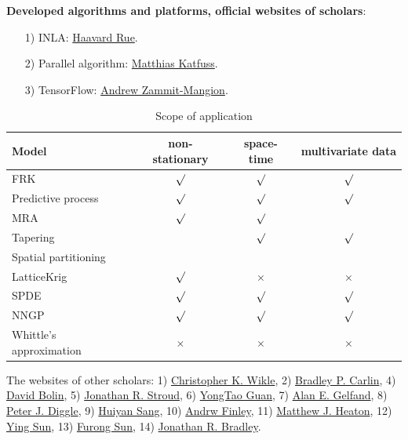 \documentclass[
12pt, %
a4paper, %
oneside, %
headinclude,footinclude, %
BCOR5mm, %
]{scrartcl}
\begin{document}
\textbf{Developed algorithms and platforms, official websites of scholars}:
\begin{itemize}
  \item [1)] INLA: \href{https://cemse.kaust.edu.sa/bayescomp}{Haavard Rue}.
  \item [2)] Parallel algorithm: \href{https://sites.google.com/view/katzfuss/}{Matthias Katfuss}.
  \item [3)] TensorFlow: \href{https://niasra.uow.edu.au/cei/people/UOW202823.html}{Andrew Zammit-Mangion}.
\end{itemize}
\begin{table}[H]
	\caption{Scope of application}
\begin{tabular}{|l|c|c|c|}
\hline
{\bf Model} & {\bf non-stationary} & {\bf space-time} & {\bf multivariate data} \\
\hline
       FRK &  $\surd$    &   $\surd$         &     $\surd$       \\
\hline
Predictive process &   $\surd$     &    $\surd$   &  $\surd$          \\
\hline
       MRA &  $\surd$     &    $\surd$    &            \\
\hline
  Tapering &      &    $\surd$   &    $\surd$    \\
\hline
Spatial partitioning &            &            &            \\
\hline
LatticeKrig &   $\surd$     &   $\times$    &   $\times$    \\
\hline
      SPDE &   $\surd$    &    $\surd$   &    $\surd$  \\
\hline
      NNGP &   $\surd$    &    $\surd$    &   $\surd$         \\
\hline
Whittle’s approximation &   $\times$      &   $\times$    &    $\times$   \\
\hline
\end{tabular}
  \label{table:Scope}
\end{table}

The websites of other scholars: 1) \href{https://www.stat.missouri.edu/people/wikle}{Christopher K. Wikle}, 2)
\href{https://www.counterpointstat.com/bradleycarlin.html}{Bradley P. Carlin}, 4)
\href{https://cemse.kaust.edu.sa/stochproc}{David Bolin}, 5)
\href{https://gufaculty360.georgetown.edu/s/contact/00336000014SrlEAAS/jonathan-stroud}{Jonathan R. Stroud}, 6)
\href{https://www.bus.miami.edu/thought-leadership/faculty/management-science/guan.html}{YongTao Guan}, 7)
\href{http://www2.stat.duke.edu/~alan/}{Alan E. Gelfand}, 8)
\href{https://www.lancaster.ac.uk/staff/diggle/}{Peter J. Diggle}, 9)
\href{https://www.stat.tamu.edu/~huiyan/}{Huiyan  Sang}, 10)
\href{https://www.canr.msu.edu/people/andrew_o_finley}{Andrw Finley}, 11)
\href{https://mheaton.byu.edu/docs/research.html}{Matthew J. Heaton}, 12)
\href{https://www.kaust.edu.sa/en/study/faculty/ying-sun}{Ying Sun}, 13)
\href{https://scholar.google.com/citations?user=dbFZvbwAAAAJ&hl=en}{Furong Sun}, 14)
\href{https://sites.google.com/site/jonathanbradley28/}{Jonathan R. Bradley}.
\end{document}
